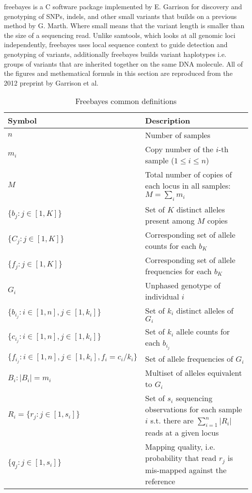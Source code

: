 freebayes\autocite{garrison2012haplotype} is a C software package implemented by E. Garrison for discovery and genotyping of SNPs, indels, and other small variants that builds on a previous method by G. Marth\autocite{marth1999general}. Where small means that the variant length is smaller than the size of a sequencing read. Unlike samtools, which looks at all genomic loci independently, freebayes uses local sequence context to guide detection and genotyping of variants, additionally freebayes builds variant haplotypes\autocite{daly2001high} i.e. groups of variants that are inherited together on the same DNA molecule. All of the figures and methematical formuls in this section are reproduced from the 2012 preprint by Garrison et al\autocite{garrison2012haplotype}.

\begin{table}[!htb]
    \caption{Freebayes common definitions}
    \label{tab:freebayes_notation}
    {\begin{tabular}{lp{7cm}}
    \toprule
    Symbol & Description \\
    \midrule
    $n$ & Number of samples \\
    $m_i$ & Copy number of the $i$-th sample ($1\le i\le n$)\\
    $M$ & Total number of copies of each locus in all samples: $M=\sum_i m_i$\\
    $\{b_j: j \in [1,K]\}$ & Set of $K$ distinct alleles present among $M$ copies\\
    $\{C_j: j \in [1,K]\}$ & Corresponding set of allele counts for each $b_K$\\
    $\{f_j: j \in [1,K]\}$ & Corresponding set of allele frequencies for each $b_K$\\
    $G_i$ & Unphased genotype of individual $i$\\
    $\{b_{i_{j}}: i \in [1,n], j \in [1,k_i]\}$ & Set of $k_i$ distinct alleles of $G_i$\\
    $\{c_{i_{j}}: i \in [1,n], j \in [1,k_i]\}$ & Set of $k_i$ allele counts for each $b_{i_{j}}$\\
    $\{f_{i_{j}}: i \in [1,n], j \in [1,k_i], f_i = c_i/k_i\}$ & Set of allele frequencies of $G_i$\\
    $B_i:|B_i| = m_i$ & Multiset of alleles equivalent to $G_i$\\
    $R_i = \{r_j: j \in [1,s_i]\} $ & Set of $s_i$ sequencing observations for each sample $i$ s.t. there are $\sum_{i=1}^n |R_i|$ reads at a given locus\\
    $\{q_j : j \in [1,s_i]\}$ & Mapping quality, i.e. probability that read $r_j$ is mis-mapped against the reference\\
    \bottomrule
    \end{tabular}}
\end{table}

